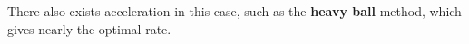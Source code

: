 \documentclass[openany]{book}
\newtheorem{theorem}{Theorem}[chapter]
\theoremstyle{definition}
\theoremstyle{remark}
\newtheorem*{remark}{Remark}
\begin{document}
There also exists acceleration in this case, such as the \textbf{heavy ball} method, which gives nearly the optimal rate.

%
\end{document}
